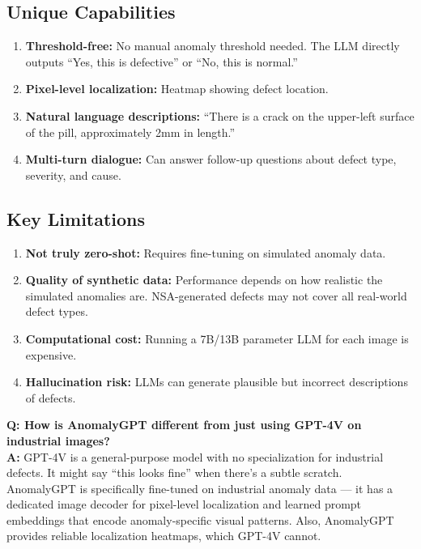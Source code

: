 \documentclass[12pt, a4paper]{article}
\begin{document}
\subsection{Unique Capabilities}
\begin{enumerate}[leftmargin=*]
    \item \textbf{Threshold-free:} No manual anomaly threshold needed. The LLM directly outputs ``Yes, this is defective'' or ``No, this is normal.''
    \item \textbf{Pixel-level localization:} Heatmap showing defect location.
    \item \textbf{Natural language descriptions:} ``There is a crack on the upper-left surface of the pill, approximately 2mm in length.''
    \item \textbf{Multi-turn dialogue:} Can answer follow-up questions about defect type, severity, and cause.
\end{enumerate}

\subsection{Key Limitations}
\begin{enumerate}[leftmargin=*]
    \item \textbf{Not truly zero-shot:} Requires fine-tuning on simulated anomaly data.
    \item \textbf{Quality of synthetic data:} Performance depends on how realistic the simulated anomalies are. NSA-generated defects may not cover all real-world defect types.
    \item \textbf{Computational cost:} Running a 7B/13B parameter LLM for each image is expensive.
    \item \textbf{Hallucination risk:} LLMs can generate plausible but incorrect descriptions of defects.
\end{enumerate}

\begin{vivaqa}
\textbf{Q: How is AnomalyGPT different from just using GPT-4V on industrial images?}\\[4pt]
\textbf{A:} GPT-4V is a general-purpose model with no specialization for industrial defects. It might say ``this looks fine'' when there's a subtle scratch. AnomalyGPT is specifically fine-tuned on industrial anomaly data --- it has a dedicated image decoder for pixel-level localization and learned prompt embeddings that encode anomaly-specific visual patterns. Also, AnomalyGPT provides reliable localization heatmaps, which GPT-4V cannot.
\end{vivaqa}
\end{document}

